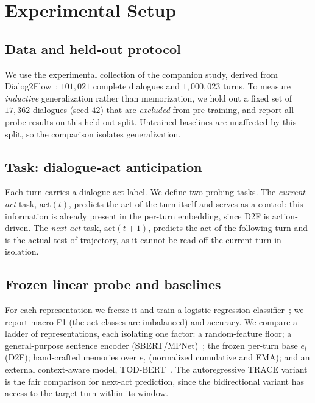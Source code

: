\documentclass[11pt]{article}
\begin{document}
\section{Experimental Setup}
\label{sec:setup}

\subsection{Data and held-out protocol}
We use the experimental collection of the companion study, derived from
Dialog2Flow~\cite{burdisso2024dialog2flow}: $101{,}021$ complete dialogues and $1{,}000{,}023$ turns.
To measure \emph{inductive} generalization rather than memorization, we hold out a fixed set of
$17{,}362$ dialogues (seed $42$) that are \emph{excluded} from pre-training, and report all probe
results on this held-out split. Untrained baselines are unaffected by this split, so the comparison
isolates generalization.

\subsection{Task: dialogue-act anticipation}
Each turn carries a dialogue-act label. We define two probing tasks. The \emph{current-act} task,
$\mathrm{act}(t)$, predicts the act of the turn itself and serves as a control: this information is
already present in the per-turn embedding, since D2F is action-driven. The \emph{next-act} task,
$\mathrm{act}(t{+}1)$, predicts the act of the following turn and is the actual test of trajectory,
as it cannot be read off the current turn in isolation.

\subsection{Frozen linear probe and baselines}
For each representation we freeze it and train a logistic-regression
classifier~\cite{devlin2019bert}; we report macro-F1 (the act classes are imbalanced) and accuracy.
We compare a ladder of representations, each isolating one factor: a random-feature floor; a
general-purpose sentence encoder (SBERT/MPNet)~\cite{reimers2019sentencebert,song2020mpnet}; the
frozen per-turn base $e_t$ (D2F); hand-crafted memories over $e_t$ (normalized cumulative and EMA);
and an external context-aware model, TOD-BERT~\cite{wu2020todbert}. The autoregressive TRACE variant
is the fair comparison for next-act prediction, since the bidirectional variant has access to the
target turn within its window.
\end{document}
